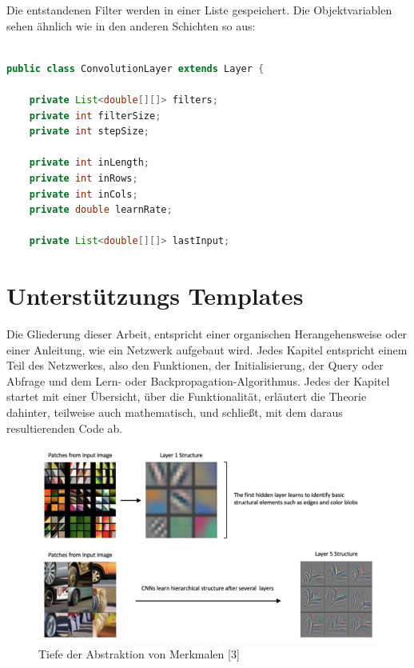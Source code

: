 \documentclass[12pt]{article}
\begin{document}
Die entstandenen Filter werden in einer Liste gespeichert. Die Objektvariablen sehen ähnlich wie in den anderen Schichten so aus:

\begin{lstlisting}[language=Java]

public class ConvolutionLayer extends Layer {

    private List<double[][]> filters;
    private int filterSize;
    private int stepSize;

    private int inLength;
    private int inRows;
    private int inCols;
    private double learnRate;

    private List<double[][]> lastInput;

\end{lstlisting}









\cleardoublepage
\section{Unterstützungs Templates}
Die Gliederung dieser Arbeit, entspricht einer organischen Herangehensweise oder einer Anleitung, wie ein Netzwerk aufgebaut wird. Jedes Kapitel entspricht einem Teil des Netzwerkes, also den Funktionen, der Initialisierung, der Query oder Abfrage und dem Lern- oder Backpropagation-Algorithmus. Jedes der Kapitel startet mit einer Übersicht, über die Funktionalität, erläutert die Theorie dahinter, teilweise auch mathematisch, und schließt, mit dem daraus resultierenden Code ab. 


\begin{figure}[H]
\centering
\includegraphics[scale=0.27]{./Images/BA_003_tensorflow-keras-cnn-hierarchical-structure.png}
\caption{Tiefe der Abstraktion von Merkmalen [3]}
\label{Tiefe der Abstraktion von Merkmalen [3]}
\end{figure}
\end{document}
